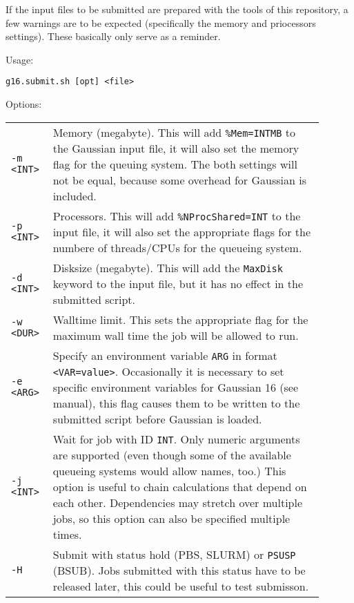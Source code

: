 \documentclass[   %
  final,          %
  a4paper         %
]{article}
\begin{document}
If the input files to be submitted are prepared with the tools of this repository,
a few warnings are to be expected (specifically the memory and priocessors settings).
These basically only serve as a reminder.

Usage: 

\lstinline`g16.submit.sh [opt] <file>`

Options:

\begin{longtable}{p{0.1\linewidth}p{0.8\linewidth}}
  {\lstinline`-m <INT>`} & Memory (megabyte).\newline 
    This will add \texttt{\%Mem={\lstinline`INT`}MB} to the Gaussian input file,
    it will also set the memory flag for the queuing system. 
    The both settings will not be equal, because some overhead for Gaussian is included. \\
  {\lstinline`-p <INT>`} & Processors.\newline 
    This will add \texttt{\%NProcShared={\lstinline`INT`}} to the input file,
    it will also set the appropriate flags for the numbere of threads/CPUs for the queueing system. \\
  {\lstinline`-d <INT>`} & Disksize (megabyte).\newline 
    This will add the \texttt{MaxDisk} keyword to the input file, but it has no effect in the submitted script. \\
  {\lstinline`-w <DUR>`} & Walltime limit. 
    This sets the appropriate flag for the maximum wall time the job will be allowed to run. \\
  {\lstinline`-e <ARG>`} & Specify an environment variable {\lstinline`ARG`} in format {\lstinline`<VAR=value>`}.
    Occasionally it is necessary to set specific environment variables for Gaussian 16 (see manual),
    this flag causes them to be written to the submitted script before Gaussian is loaded. \\
  {\lstinline`-j <INT>`} & Wait for job with ID {\lstinline`INT`}.
    Only numeric arguments are supported (even though some of the available queueing systems would allow names, too.)
    This option is useful to chain calculations that depend on each other. 
    Dependencies may stretch over multiple jobs, so this option can also be specified multiple times.\\
  {\lstinline`-H`}       & Submit with status hold (PBS, SLURM) or \texttt{PSUSP} (BSUB).
    Jobs submitted with this status have to be released later, this could be useful to test submisson.

\end{longtable}
\end{document}
